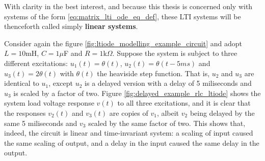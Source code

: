 	With clarity in the best interest, and because this thesis is concerned only with systems of the form \eqref{eq:matrix_lti_ode_eq_def}, these LTI systems will be thenceforth called simply \textbf{linear systems}.
	
\begin{example}\label{example:rlc_circuit_lti_ode_example} %
	Consider again the figure \ref{fig:ltiode_modelling_example_circuit} and adopt  $L = 10$mH, $C = 1\mu$F and $R = 1$k$\Omega$. Suppose the system is subject to three different excitations: $u_1(t) = \theta\left(t\right)$, $u_2(t) = \theta\left(t-5ms\right)$ and $u_3(t) = 2\theta\left(t\right)$ with $\theta(t)$ the heaviside step function. That is, $u_2$ and $u_3$ are identical to $u_1$, except $u_2$ is a delayed version with a delay of 5 miliseconds and $u_3$ is scaled by a factor of two. Figure \ref{fig:delayed_example_rlc_ltiode} shows the system load voltage response $v(t)$ to all three excitations, and it is clear that the responses $v_2(t)$ and $v_3(t)$ are copies of $v_1$, albeit $v_2$ being delayed by the same 5 miliseconds and $v_3$ scaled by the same factor of two. This shows that, indeed, the circuit is linear and time-invariant system: a scaling of input caused the same scaling of output, and a delay in the input caused the same delay in the output.


\end{example}
